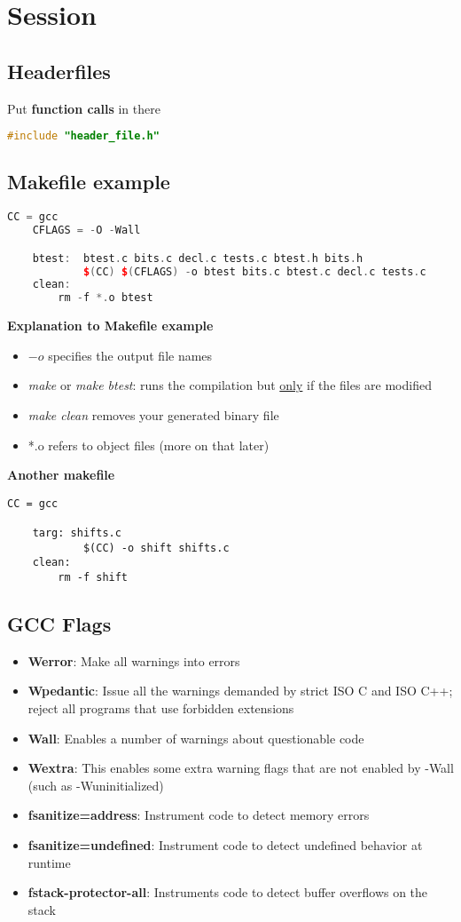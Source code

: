 \documentclass[a4paper,10pt]{article}
\begin{document}
\section{Session}
\subsection{Headerfiles}
Put \textbf{function calls} in there
\begin{lstlisting}[language=C++]
    #include "header_file.h" 
\end{lstlisting}
\subsection{Makefile example}
\begin{lstlisting}[language=C++]
    CC = gcc
    CFLAGS = -O -Wall

    btest:  btest.c bits.c decl.c tests.c btest.h bits.h
            $(CC) $(CFLAGS) -o btest bits.c btest.c decl.c tests.c
    clean:
        rm -f *.o btest
\end{lstlisting}
\textbf{Explanation to Makefile example}
\begin{itemize}
    \item $-o$ specifies the output file names
    \item \textit{make} or \textit{make btest}: runs the compilation but \underline{only} if the files are modified
    \item \textit{make clean} removes your generated binary file
    \item *.o refers to object files (more on that later)
\end{itemize}

\textbf{Another makefile}
\begin{lstlisting}[]
    CC = gcc

    targ: shifts.c
            $(CC) -o shift shifts.c
    clean:
        rm -f shift
\end{lstlisting}

\subsection{GCC Flags}
\begin{itemize}
    \item \textbf{Werror}: Make all warnings into errors
    \item \textbf{Wpedantic}: Issue all the warnings demanded by strict ISO C and ISO C++; reject all programs that use forbidden extensions
    \item \textbf{Wall}: Enables a number of warnings about questionable code
    \item \textbf{Wextra}: This enables some extra warning flags that are not enabled by -Wall
(such as -Wuninitialized)
    \item \textbf{fsanitize=address}: Instrument code to detect memory errors
    \item \textbf{fsanitize=undefined}: Instrument code to detect undefined behavior at runtime
    \item \textbf{fstack-protector-all}: Instruments code to detect buffer overflows on the stack

\end{itemize}
\end{document}
